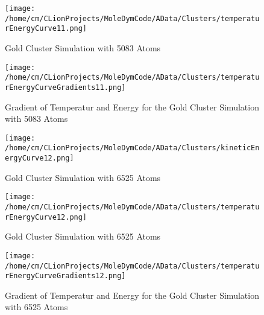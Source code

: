 \begin{figure}[!h] 
    \begin{center} 
        \texttt{[image: /home/cm/CLionProjects/MoleDymCode/AData/Clusters/temperaturEnergyCurve11.png]} 
    \end{center} 
    \caption[Gold Cluster Simulation with 5083 Atoms]{Gold Cluster Simulation with 5083 Atoms} 
    \label{GoldClusterSimulationTemperaturEnergy5083} 
\end{figure} 
 
\begin{figure}[!h] 
    \begin{center} 
        \texttt{[image: /home/cm/CLionProjects/MoleDymCode/AData/Clusters/temperaturEnergyCurveGradients11.png]} 
    \end{center} 
    \caption[Gradient of Temperatur and Energy for the Gold Cluster Simulation with 5083 Atoms]{Gradient of Temperatur and Energy for the Gold Cluster Simulation with 5083 Atoms} 
    \label{GoldClusterSimulationGradient5083} 
\end{figure} 
 
\begin{figure}[!h] 
    \begin{center} 
        \texttt{[image: /home/cm/CLionProjects/MoleDymCode/AData/Clusters/kineticEnergyCurve12.png]} 
    \end{center} 
    \caption[Gold Cluster Simulation with 6525 Atoms]{Gold Cluster Simulation with 6525 Atoms} 
    \label{GoldClusterSimulationKineticTime6525} 
\end{figure} 
 
\begin{figure}[!h] 
    \begin{center} 
        \texttt{[image: /home/cm/CLionProjects/MoleDymCode/AData/Clusters/temperaturEnergyCurve12.png]} 
    \end{center} 
    \caption[Gold Cluster Simulation with 6525 Atoms]{Gold Cluster Simulation with 6525 Atoms} 
    \label{GoldClusterSimulationTemperaturEnergy6525} 
\end{figure} 
 
\begin{figure}[!h] 
    \begin{center} 
        \texttt{[image: /home/cm/CLionProjects/MoleDymCode/AData/Clusters/temperaturEnergyCurveGradients12.png]} 
    \end{center} 
    \caption[Gradient of Temperatur and Energy for the Gold Cluster Simulation with 6525 Atoms]{Gradient of Temperatur and Energy for the Gold Cluster Simulation with 6525 Atoms} 
    \label{GoldClusterSimulationGradient6525} 
\end{figure} 
 
